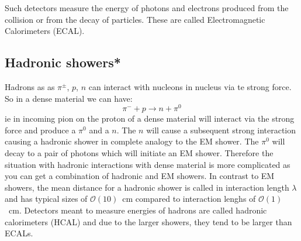 Such detectors measure the energy of photons and electrons produced from the collision or from the decay of particles. These are called Electromagnetic Calorimeters (ECAL).
\subsection{Hadronic showers*}
Hadrons as as $\pi^{\pm}$, $p$, $n$ can interact with nucleons in nucleus via te strong force. So in a dense material we can have:
\[\pi^-+p\to n+\pi^0\]
ie in incoming pion on the proton of a dense material will interact via the strong force and produce a $\pi^0$ and a $n$. The $n$ will cause a subsequent strong interaction causing a hadronic shower in complete analogy to the EM shower. The $\pi^0$ will decay to a pair of photons which will initiate an EM shower. Therefore the situation with hadronic interactions with dense material is more complicated as you can get a combination of hadronic and EM showers.
In contrast to EM showers, the mean distance for a hadronic shower is called in interaction length $\lambda$ and has typical sizes of $\mathcal{O}(10)$~cm compared to interaction lenghs of $\mathcal{O}(1)$~cm. Detectors meant to measure energies of hadrons are called hadronic calorimeters (HCAL) and due to the larger showers, they tend to be larger than ECALs.

